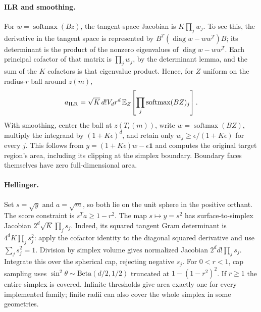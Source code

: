 \paragraph{ILR and smoothing.}
For $w=\operatorname{softmax}(Bz)$, the tangent-space Jacobian is $K\prod_j w_j$. To see this, the derivative in the tangent space is represented by $B^T(\operatorname{diag}w-ww^T)B$; its determinant is the product of the nonzero eigenvalues of $\operatorname{diag}w-ww^T$. Each principal cofactor of that matrix is $\prod_j w_j$, by the determinant lemma, and the sum of the $K$ cofactors is that eigenvalue product. Hence, for $Z$ uniform on the radius-$r$ ball around $z(m)$,
\begin{equation}
 a_{\rm ILR}=\sqrt K\,d!V_dr^d\,\mathbb E_Z\!\left[\prod_j\operatorname{softmax}(BZ)_j\right].
 \label{eq:ilr-integral}
\end{equation}
With smoothing, center the ball at $z(T_\epsilon(m))$, write $w=\operatorname{softmax}(BZ)$, multiply the integrand by $(1+K\epsilon)^d$, and retain only $w_j\geq\epsilon/(1+K\epsilon)$ for every $j$. This follows from $y=(1+K\epsilon)w-\epsilon\mathbf1$ and computes the original target region's area, including its clipping at the simplex boundary. Boundary faces themselves have zero full-dimensional area.

\paragraph{Hellinger.}
Set $s=\sqrt y$ and $a=\sqrt m$, so both lie on the unit sphere in the positive orthant. The score constraint is $s^Ta\geq1-r^2$. The map $s\mapsto y=s^2$ has surface-to-simplex Jacobian $2^d\sqrt K\prod_j s_j$. Indeed, its squared tangent Gram determinant is $4^dK\prod_j s_j^2$: apply the cofactor identity to the diagonal squared derivative and use $\sum_js_j^2=1$. Division by simplex volume gives normalized Jacobian $2^dd!\prod_js_j$. Integrate this over the spherical cap, rejecting negative $s_j$. For $0<r<1$, cap sampling uses $\sin^2\theta\sim\mathrm{Beta}(d/2,1/2)$ truncated at $1-(1-r^2)^2$. If $r\geq1$ the entire simplex is covered. Infinite thresholds give area exactly one for every implemented family; finite radii can also cover the whole simplex in some geometries.

